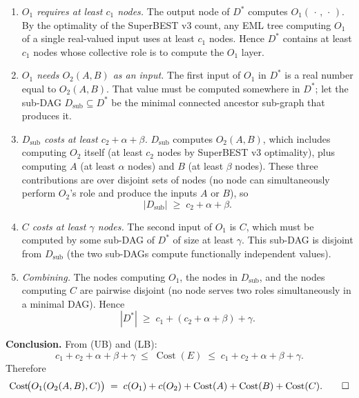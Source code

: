 \documentclass[12pt,a4paper]{article}
\theoremstyle{definition}
\newcommand{\Cost}{\operatorname{Cost}}
\newcommand{\uc}[1]{c(#1)}   %
\begin{document}
\begin{enumerate}
  \item \emph{$O_1$ requires at least $c_1$ nodes.}
        The output node of $D^*$ computes $O_1(\,\cdot\,,\,\cdot\,)$.
        By the optimality of the SuperBEST v3 count, any EML tree
        computing $O_1$ of a single real-valued input uses at least
        $c_1$ nodes.  Hence $D^*$ contains at least $c_1$ nodes whose
        collective role is to compute the $O_1$ layer.

  \item \emph{$O_1$ needs $O_2(A,B)$ as an input.}
        The first input of $O_1$ in $D^*$ is a real number equal to
        $O_2(A,B)$.  That value must be computed somewhere in $D^*$;
        let the sub-DAG $D_{\mathrm{sub}} \subseteq D^*$ be the minimal
        connected ancestor sub-graph that produces it.

  \item \emph{$D_{\mathrm{sub}}$ costs at least $c_2 + \alpha + \beta$.}
        $D_{\mathrm{sub}}$ computes $O_2(A,B)$, which includes computing
        $O_2$ itself (at least $c_2$ nodes by SuperBEST v3 optimality),
        plus computing $A$ (at least $\alpha$ nodes) and $B$ (at least
        $\beta$ nodes).  These three contributions are over disjoint sets
        of nodes (no node can simultaneously perform $O_2$'s role and
        produce the inputs $A$ or $B$), so
        \[
          |D_{\mathrm{sub}}| \;\geq\; c_2 + \alpha + \beta.
        \]

  \item \emph{$C$ costs at least $\gamma$ nodes.}
        The second input of $O_1$ is $C$, which must be computed by some
        sub-DAG of $D^*$ of size at least $\gamma$.  This sub-DAG is
        disjoint from $D_{\mathrm{sub}}$ (the two sub-DAGs compute
        functionally independent values).

  \item \emph{Combining.}
        The nodes computing $O_1$, the nodes in $D_{\mathrm{sub}}$, and
        the nodes computing $C$ are pairwise disjoint (no node serves two
        roles simultaneously in a minimal DAG).  Hence
        \[
          |D^*| \;\geq\; c_1 + (c_2 + \alpha + \beta) + \gamma.
          \tag{LB}
        \]
\end{enumerate}

\medskip
\noindent\textbf{Conclusion.}
From (UB) and (LB):
\[
  c_1 + c_2 + \alpha + \beta + \gamma
  \;\leq\; \Cost(E)
  \;\leq\; c_1 + c_2 + \alpha + \beta + \gamma.
\]
Therefore
\[
  \Cost\!\bigl(O_1(O_2(A,B),C)\bigr)
  \;=\; \uc{O_1} + \uc{O_2} + \Cost(A) + \Cost(B) + \Cost(C). \qed
\]
\end{document}
